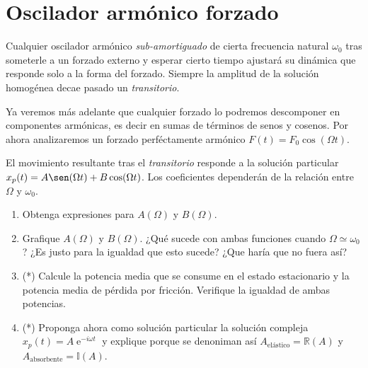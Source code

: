 \section*{Oscilador armónico forzado}
\item Cualquier oscilador armónico \emph{sub-amortiguado} de cierta frecuencia natural \(\omega_0\) tras someterle a un forzado externo y esperar cierto tiempo ajustará su dinámica que responde solo a la forma del forzado.
Siempre la amplitud de la solución homogénea decae pasado un \emph{transitorio}. 

Ya veremos más adelante que cualquier forzado lo podremos descomponer en componentes armónicas, es decir en sumas de términos de senos y cosenos.
Por ahora analizaremos un forzado perféctamente armónico \(F(t) = F_0 \cos(\Omega t)\).

El movimiento resultante tras el \emph{transitorio} responde a la solución particular $x_p(t) = A \sen(\Omega t) + B \cos(\Omega t)$.
Los coeficientes dependerán de la relación entre \(\Omega\) y \(\omega_0\).

\begin{enumerate}
	\item Obtenga expresiones para $A(\Omega)$ y $B(\Omega)$.
	\item Grafique $A(\Omega)$ y $B(\Omega)$. ¿Qué sucede con ambas funciones cuando \(\Omega \simeq \omega_0\)? ¿Es justo para la igualdad que esto sucede? ¿Que haría que no fuera así? 
	\item (*) Calcule la potencia media que se consume en el estado estacionario y la potencia media de pérdida por fricción.
	Verifique la igualdad de ambas potencias.
	\item (*) Proponga ahora como solución particular la solución compleja \(x_p(t) = A \operatorname{e}^{-i \omega t}\) y explique porque se denoniman así \(A_\text{elástico} = \mathbb{R} (A)\) y \(A_\text{absorbente} = \mathbb{I} (A)\).
\end{enumerate}



